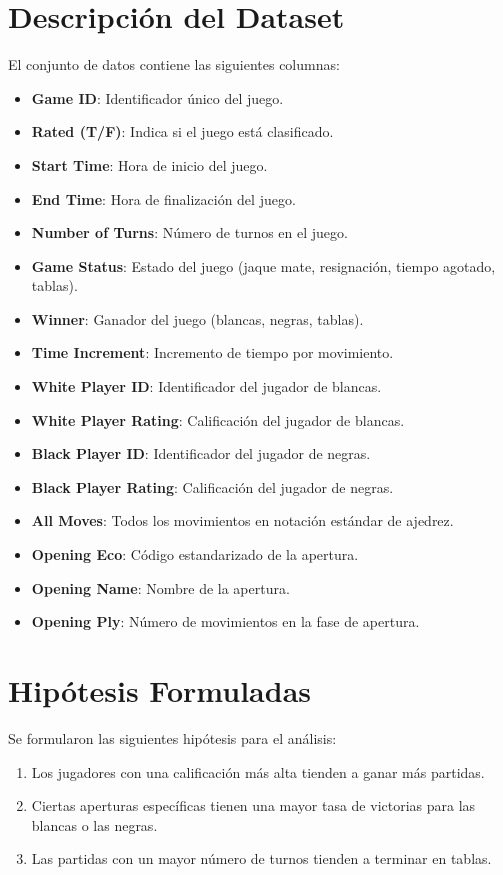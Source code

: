 \documentclass[a4paper, 12pt]{article}
\begin{document}
\section{Descripción del Dataset}
El conjunto de datos contiene las siguientes columnas:
\begin{itemize}
    \item \textbf{Game ID}: Identificador único del juego.
    \item \textbf{Rated (T/F)}: Indica si el juego está clasificado.
    \item \textbf{Start Time}: Hora de inicio del juego.
    \item \textbf{End Time}: Hora de finalización del juego.
    \item \textbf{Number of Turns}: Número de turnos en el juego.
    \item \textbf{Game Status}: Estado del juego (jaque mate, resignación, tiempo agotado, tablas).
    \item \textbf{Winner}: Ganador del juego (blancas, negras, tablas).
    \item \textbf{Time Increment}: Incremento de tiempo por movimiento.
    \item \textbf{White Player ID}: Identificador del jugador de blancas.
    \item \textbf{White Player Rating}: Calificación del jugador de blancas.
    \item \textbf{Black Player ID}: Identificador del jugador de negras.
    \item \textbf{Black Player Rating}: Calificación del jugador de negras.
    \item \textbf{All Moves}: Todos los movimientos en notación estándar de ajedrez.
    \item \textbf{Opening Eco}: Código estandarizado de la apertura.
    \item \textbf{Opening Name}: Nombre de la apertura.
    \item \textbf{Opening Ply}: Número de movimientos en la fase de apertura.
\end{itemize}

\section{Hipótesis Formuladas}
Se formularon las siguientes hipótesis para el análisis:
\begin{enumerate}
    \item Los jugadores con una calificación más alta tienden a ganar más partidas.
    \item Ciertas aperturas específicas tienen una mayor tasa de victorias para las blancas o las negras.
    \item Las partidas con un mayor número de turnos tienden a terminar en tablas.

\end{enumerate}
\end{document}
